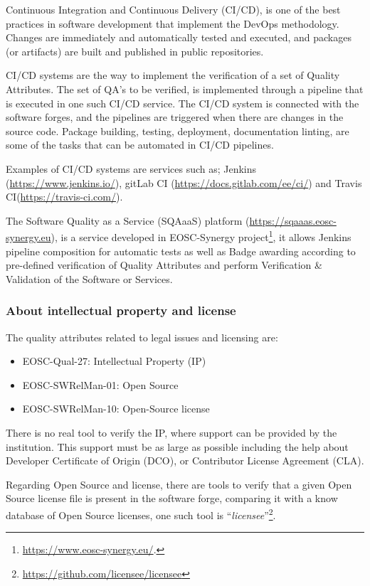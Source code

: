 Continuous Integration and Continuous Delivery (CI/CD), is one of the best practices in software development that implement the DevOps methodology. Changes are immediately and automatically tested and executed, and packages (or artifacts) are built and published in public repositories. 

CI/CD systems are the way to implement the verification of a set of Quality Attributes. The set of QA's to be verified, is implemented through a pipeline that is executed in one such CI/CD service. The CI/CD system is connected with the software forges, and the pipelines are triggered when there are changes in the source code.
Package building, testing, deployment, documentation linting, are some of the tasks that can be automated in CI/CD pipelines.

Examples of CI/CD systems are services such as; Jenkins (\url{https://www.jenkins.io/}), gitLab CI (\url{https://docs.gitlab.com/ee/ci/}) and Travis CI(\url{https://travis-ci.com/}).

The Software Quality as a Service (SQAaaS) platform (\url{https://sqaaas.eosc-synergy.eu}), is a service developed in EOSC-Synergy project\footnote{\url{https://www.eosc-synergy.eu/}.}, it allows Jenkins pipeline composition for automatic tests as well as Badge awarding according to pre-defined verification of Quality Attributes and perform Verification \& Validation of the Software or Services.

\subsubsection{About intellectual property and license}

The quality attributes related to legal issues and licensing are:

\begin{itemize}
  \item EOSC-Qual-27: Intellectual Property (IP)
  \item EOSC-SWRelMan-01: Open Source
  \item EOSC-SWRelMan-10: Open-Source license
\end{itemize}

There is no real tool to verify the IP, where support can be provided by the institution. This support must be as large as possible including the help about Developer Certificate of Origin (DCO), or Contributor License Agreement (CLA).

Regarding Open Source and license, there are tools to verify that a given Open Source license file is present in the software forge, comparing it with a know database of Open Source licenses, one such tool is ``\textit{licensee}''\footnote{\url{https://github.com/licensee/licensee}}.

